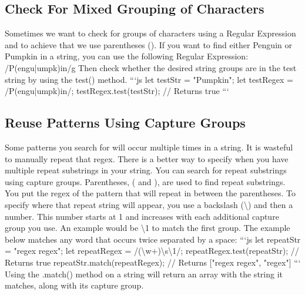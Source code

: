 \documentclass{article}%
\begin{document}
%
\subsection{Check For Mixed Grouping of Characters}%
\label{subsec:CheckForMixedGroupingofCharacters}%
Sometimes we want to check for groups of characters using a Regular Expression and to achieve that we use parentheses ().\newline%
If you want to find either Penguin or Pumpkin in a string, you can use the following Regular Expression: /P(engu|umpk)in/g\newline%
Then check whether the desired string groups are in the test string by using the test() method.\newline%
```js\newline%
let testStr = "Pumpkin";\newline%
let testRegex = /P(engu|umpk)in/;\newline%
testRegex.test(testStr);\newline%
// Returns true\newline%
```\newline%

%
\subsection{Reuse Patterns Using Capture Groups}%
\label{subsec:ReusePatternsUsingCaptureGroups}%
Some patterns you search for will occur multiple times in a string. It is wasteful to manually repeat that regex. There is a better way to specify when you have multiple repeat substrings in your string.\newline%
You can search for repeat substrings using capture groups. Parentheses, ( and ), are used to find repeat substrings. You put the regex of the pattern that will repeat in between the parentheses.\newline%
To specify where that repeat string will appear, you use a backslash (\textbackslash{}) and then a number. This number starts at 1 and increases with each additional capture group you use. An example would be \textbackslash{}1 to match the first group.\newline%
The example below matches any word that occurs twice separated by a space:\newline%
```js\newline%
let repeatStr = "regex regex";\newline%
let repeatRegex = /(\textbackslash{}w+)\textbackslash{}s\textbackslash{}1/;\newline%
repeatRegex.test(repeatStr); // Returns true\newline%
repeatStr.match(repeatRegex); // Returns {[}"regex regex", "regex"{]}\newline%
```\newline%
Using the .match() method on a string will return an array with the string it matches, along with its capture group.\newline%
\end{document}
